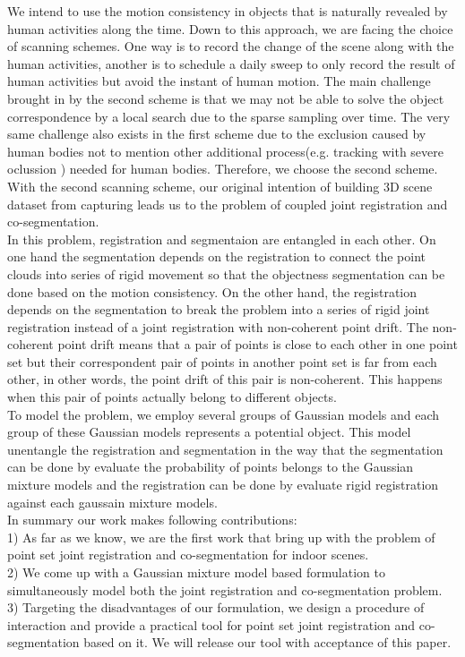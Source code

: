 We intend to use the motion consistency in objects that is naturally revealed by human activities along the time. Down to this approach, we are facing the choice of scanning schemes. One way is to record the change of the scene along with the human activities, another is to  schedule a daily sweep to only record the result of human activities but avoid the instant of human motion. The main challenge brought in by the second scheme is that we may not be able to solve the object correspondence by a local search due to the sparse sampling over time. The very same challenge also exists in the first scheme due to the exclusion caused by human bodies not to mention other additional process(e.g. tracking with severe oclussion ) needed for human bodies. Therefore, we choose the second scheme. With the second scanning scheme, our original intention of building 3D scene dataset from capturing leads us to the problem of coupled joint registration and co-segmentation.\\ 
In this problem, registration and segmentaion are entangled in each other. On one hand the segmentation depends on the registration to connect the point clouds into series of rigid movement so that the objectness segmentation can be done based on the motion consistency. On the other hand, the registration depends on the segmentation to break the problem into a series of rigid joint registration instead of a joint registration with non-coherent point drift. The non-coherent point drift means that a pair of points is close to each other in one point set but their correspondent pair of points in another point set is far from each other, in other words, the point drift of this pair is non-coherent. This happens when this pair of points actually belong to different objects.\\
To model the problem, we employ several groups of Gaussian models and each group of these Gaussian models represents a potential object. This model unentangle the registration and segmentation in the way that the segmentation can be done by evaluate the probability of points belongs to the Gaussian mixture models and the registration can be done by evaluate rigid registration against each gaussain mixture models.\\
In summary our work makes following contributions: \\
%
%
1) As far as we know, we are the first work that bring up with the problem of point set joint registration and co-segmentation for indoor scenes.\\
2) We come up with a Gaussian mixture model based formulation to simultaneously model both the joint registration and co-segmentation problem.\\
3) Targeting the disadvantages of our formulation, we design a procedure of interaction and provide a practical tool for point set joint registration and co-segmentation based on it. We will release our tool with acceptance of this paper.
